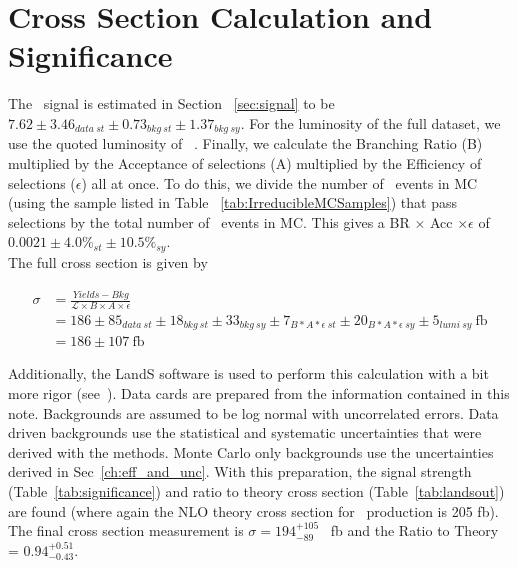 	
	
	\section{Cross Section Calculation and Significance}
	The \ttZ \ signal is estimated in Section ~\ref{sec:signal} to be $7.62 \pm 3.46_{data\ st} \pm 0.73_{bkg\ st} \pm 1.37_{bkg\ sy}$. For the luminosity of the full dataset, we use the quoted luminosity of \intLumiwError~\cite{lumi12up}. Finally, we calculate the Branching Ratio (B) multiplied by the Acceptance of selections (A) multiplied by the Efficiency of selections ($\epsilon$) all at once. To do this, we divide the number of \ttZ \ events in MC (using the sample listed in Table ~\ref{tab:IrreducibleMCSamples}) that pass selections by the total number of \ttZ \ events in MC. This gives a BR $\times$ Acc $\times \epsilon$ of $0.0021 \pm 4.0\% _{st} \pm 10.5\% _{sy}$.\\

The full cross section is given by 

\begin{align}
         \sigma &= \frac{Yields - Bkg}{\mathcal{L} \times B \times A\times \epsilon}\\
                      &=  186 \pm 85_{data\ st} \pm 18_{bkg\ st} \pm 33_{bkg\ sy}\pm 7_{B*A*\epsilon\ st} \pm 20_{B*A*\epsilon\ sy} \pm 5_{lumi\ sy}\ \text{fb}\\
                      &= 186 \pm 107\ \text{fb}
\end{align}
          
          
 Additionally, the LandS software is used to perform this calculation with a bit more rigor (see~\cite{higgscomb}). Data cards are prepared from the information contained in this note. Backgrounds are assumed to be log normal with uncorrelated errors. Data driven backgrounds use the statistical and systematic uncertainties that were derived with the methods. Monte Carlo only backgrounds use the uncertainties derived in Sec~\ref{ch:eff_and_unc}. With this preparation, the signal strength (Table~\ref{tab:significance}) and ratio to theory cross section (Table~\ref{tab:landsout}) are found (where again the NLO theory cross section for \ttZ \ production is 205 fb). The final cross section measurement is $\sigma=194 _{-89} ^{+105}$ \ fb and the Ratio to Theory = $0.94 _{-0.43} ^{+0.51}$.\\
 
